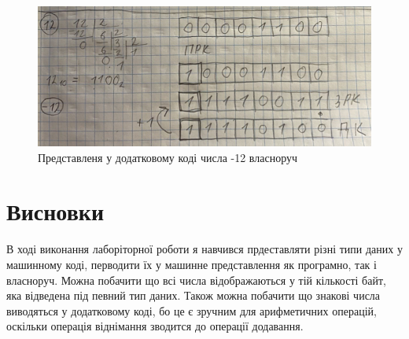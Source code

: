 \begin{figure}[h!]
    \centering
    \includegraphics[width=16cm]{reports/algos/lab3/assets/4.jpg}
    \caption{Представленя у додатковому коді числа -12 власноруч}
\end{figure}

\clearpage
\section{Висновки}
В ході виконання лаборіторної роботи я навчився прдеставляти різні типи даних у машинному коді, перводити їх у машинне представлення як програмно, так і власноруч. Можна побачити що всі числа відображаються у тій кількості байт, яка відведена під певний тип даних. Також можна побачити що знакові числа виводяться у додатковому коді, бо це є зручним для арифметичних операцій, оскільки операція віднімання зводится до операції додавання.

